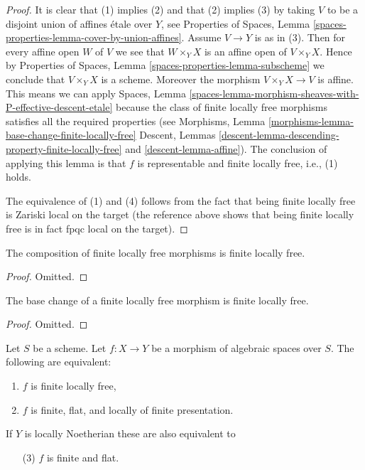 \begin{proof}
It is clear that (1) implies (2) and that (2) implies (3) by taking
$V$ to be a disjoint union of affines \'etale over $Y$, see
Properties of Spaces,
Lemma \ref{spaces-properties-lemma-cover-by-union-affines}.
Assume $V \to Y$ is as in (3). Then for every affine open $W$ of $V$ we see
that $W \times_Y X$ is an affine open of $V \times_Y X$. Hence by
Properties of Spaces, Lemma \ref{spaces-properties-lemma-subscheme}
we conclude that $V \times_Y X$ is a scheme. Moreover the morphism
$V \times_Y X \to V$ is affine. This means we can apply
Spaces,
Lemma \ref{spaces-lemma-morphism-sheaves-with-P-effective-descent-etale}
because the class of finite locally free morphisms
satisfies all the required properties (see
Morphisms, Lemma \ref{morphisms-lemma-base-change-finite-locally-free}
Descent, Lemmas \ref{descent-lemma-descending-property-finite-locally-free}
and \ref{descent-lemma-affine}).
The conclusion of applying this lemma is that $f$ is representable
and finite locally free, i.e., (1) holds.

\medskip\noindent
The equivalence of (1) and (4) follows from the fact that being
finite locally free is Zariski local on the target (the reference above shows
that being finite locally free is in fact fpqc local on the target).
\end{proof}

\begin{lemma}
\label{lemma-composition-finite-locally-free}
The composition of finite locally free morphisms is finite locally free.
\end{lemma}

\begin{proof}
Omitted.
\end{proof}

\begin{lemma}
\label{lemma-base-change-finite-locally-free}
The base change of a finite locally free morphism is finite locally free.
\end{lemma}

\begin{proof}
Omitted.
\end{proof}

\begin{lemma}
\label{lemma-finite-flat}
Let $S$ be a scheme.
Let $f : X \to Y$ be a morphism of algebraic spaces over $S$.
The following are equivalent:
\begin{enumerate}
\item $f$ is finite locally free,
\item $f$ is finite, flat, and locally of finite presentation.
\end{enumerate}
If $Y$ is locally Noetherian these are also equivalent to
\begin{enumerate}
\item[(3)] $f$ is finite and flat.
\end{enumerate}
\end{lemma}


